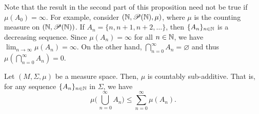 \begin{remark}
Note that the result in the second part of this proposition need not be true if $\mu(A_0)=\infty$. For example, consider $(\mathbb{N},\mathscr{P}(\mathbb{N}),\mu)$, where $\mu$ is the counting measure on $(\mathbb{N},\mathscr{P}(\mathbb{N}))$. If $A_n = \{n, n+1, n+2, \ldots\}$, then $\{A_n\}_{n\in\mathbb{N}}$ is a decreasing sequence. Since $\mu(A_n) = \infty$ for all $n \in \mathbb{N}$, we have $\displaystyle \lim_{n \to \infty} \mu(A_n) = \infty$. On the other hand, $ \bigcap_{n=0}^{\infty}A_n = \varnothing$ and thus $\mu(\bigcap_{n=0}^{\infty}A_n) =0$.
\end{remark}

\begin{proposition}
Let $(M,\Sigma,\mu)$ be a measure space. Then, $\mu$ is countably sub-additive. That is, for any sequence $\{A_n\}_{n\in\mathbb{N}}$ in $\Sigma$, we have
\begin{equation*}
\mu\biggl(\bigcup_{\,n=0}^{\infty}A_n\biggr)\leq \sum_{n=0}^{\infty}\mu(A_n).
\end{equation*}
\end{proposition}


